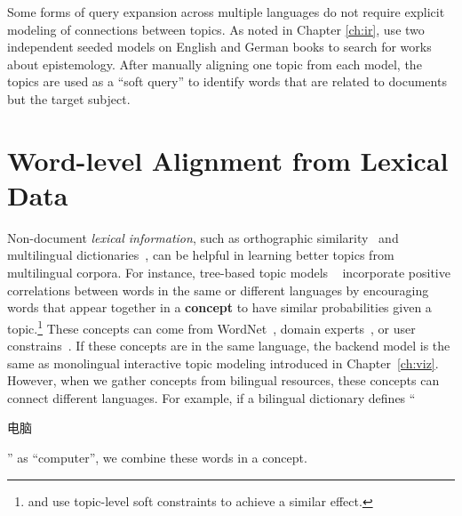 
Some forms of query expansion across multiple languages do not require explicit modeling of connections between topics.
As noted in Chapter \ref{ch:ir}, \citet{erlin2017topic} use two independent seeded models on English and German books to search for works about epistemology.
After manually aligning one topic from each model, the topics are used as a ``soft query'' to identify words that are related to documents but the target subject.

\section{Word-level Alignment from Lexical Data}


Non-document \emph{lexical information}, such as orthographic
similarity~\citep{boyd-graber-09} and multilingual
dictionaries~\citep{Zhang-10,boyd-graber-10}, can be helpful in learning
better topics from multilingual corpora. For instance, tree-based
topic models ~\citep{boyd-graber-07,andrzejewski-09,hu-14:itm}
incorporate positive correlations between words in the same or
different languages by encouraging words that appear together in a
{\bf concept} to have similar probabilities given a
topic.\footnote{\citet{boyd-graber-09} and \citet{Zhang-10} use
  topic-level soft constraints to achieve a similar effect.} These
concepts can come from WordNet~\citep{boyd-graber-10}, domain
experts~\citep{andrzejewski-09}, or user
constrains~\citep{hu-14:itm}. If these concepts are in the same
language, the backend model is the same as monolingual interactive topic modeling
introduced in Chapter~\ref{ch:viz}. However, when we gather concepts
from bilingual resources, these concepts can connect different
languages. For example, if a bilingual dictionary defines
``\begin{CJK*}{UTF8}{gbsn}电脑\end{CJK*}'' as ``computer'', we combine
  these words in a concept.

